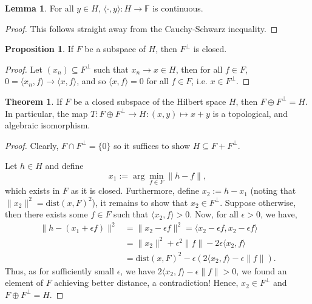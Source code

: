 \documentclass[
]{article}
\theoremstyle{definition}
\newtheorem{theorem}{Theorem}
\theoremstyle{definition}
\newtheorem{lemma}{Lemma}[section]
\newtheorem{proposition}{Proposition}[section]
\begin{document}
\begin{lemma}
  For all \(y \in H\), \(\langle \cdot, y \rangle : H \to \mathbb{F}\) is 
  continuous.
\end{lemma}
\begin{proof}
  This follows straight away from the Cauchy-Schwarz inequality.
\end{proof}

\begin{proposition}
  If \(F\) be a subspace of \(H\), then \(F^\perp\) is closed.
\end{proposition}
\begin{proof}
  Let \((x_n) \subseteq F^\perp\) such that \(x_n \to x \in H\), then for all 
  \(f \in F\), \(0 = \langle x_n, f\rangle \to \langle x, f\rangle\), and so 
  \(\langle x, f\rangle = 0\) for all \(f \in F\), i.e. \(x \in F^\perp\). 
\end{proof}

\begin{theorem}
  If \(F\) be a closed subspace of the Hilbert space \(H\), then
  \(F \oplus F^\perp = H\). In particular, the map 
  \(T : F \oplus F^\perp \to H : (x, y) \mapsto x + y\) is a topological, 
  and algebraic isomorphism.
\end{theorem}
\begin{proof}
  Clearly, \(F \cap F^\perp = \{0\}\) so it suffices to show 
  \(H \subseteq F + F^\perp\).

  Let \(h \in H\) and define 
  \[x_1 := \arg \min_{f \in F} \|h - f\|,\]
  which exists in \(F\) as it is closed. Furthermore, define \(x_2 := h - x_1\)
  (noting that \(\|x_2\|^2 = \text{dist}(x, F)^2\)), 
  it remains to show that \(x_2 \in F^\perp\). Suppose otherwise, then 
  there exists some \(f \in F\) such that \(\langle x_2, f \rangle > 0\). 
  Now, for all \(\epsilon > 0\), we have, 
  \begin{align*}
    \|h - (x_1 + \epsilon f)\|^2 & = \|x_2 - \epsilon f\|^2 = \langle x_2 - \epsilon f, x_2 - \epsilon f \rangle\\
    & = \|x_2\|^2 + \epsilon^2\|f\| - 2\epsilon \langle x_2, f \rangle\\
    & = \text{dist}(x, F)^2 - \epsilon (2 \langle x_2, f \rangle - \epsilon \|f\|).
  \end{align*}
  Thus, as for sufficiently small \(\epsilon\), we have 
  \(2 \langle x_2, f \rangle - \epsilon \|f\| > 0\), we found an element of \(F\) 
  achieving better distance, a contradiction! Hence, \(x_2 \in F^\perp\) and 
  \(F \oplus F^\perp = H\). 
\end{proof}
\end{document}
